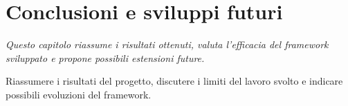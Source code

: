 \chapter{Conclusioni e sviluppi futuri}
\begin{minipage}{12cm}\textit{Questo capitolo riassume i risultati ottenuti, valuta l'efficacia del framework sviluppato e propone possibili estensioni future.}
\end{minipage}
\vspace*{1cm}

Riassumere i risultati del progetto, discutere i limiti del lavoro svolto e indicare possibili evoluzioni del framework.
